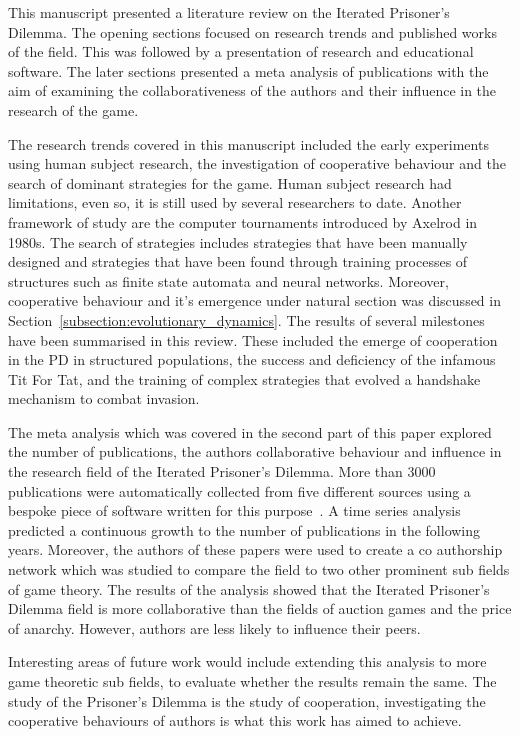 \documentclass{article}
\theoremstyle{definition}
\begin{document}
This manuscript presented a literature review on the Iterated
Prisoner's Dilemma. The opening sections focused on research trends and
published works of the field. This was followed by a
presentation of research and educational software. The later sections presented a
meta analysis of publications with the aim of examining the collaborativeness of
the authors and their influence in the research of the game.

The research trends covered in this manuscript included the early experiments
using human subject research, the investigation of cooperative behaviour and the
search of dominant strategies for the game. Human subject research had
limitations, even so, it is still used by several researchers to date. Another
framework of study are the computer tournaments introduced by Axelrod in
1980s. The search of strategies includes strategies that have been manually
designed and strategies that have been found through
training processes of structures such as finite state automata and neural
networks. Moreover, cooperative behaviour and it's emergence under natural
section was discussed in Section~\ref{subsection:evolutionary_dynamics}.
The results of several milestones have been summarised in this review. These
included the emerge of cooperation in the PD in structured populations, the success
and deficiency of the infamous Tit For Tat, and the training of complex strategies
that evolved a handshake mechanism to combat invasion.

The meta analysis which was covered in the second part of this paper explored
the number of publications, the authors collaborative behaviour and influence in
the research field of the Iterated Prisoner's Dilemma. More than 3000
publications were automatically collected from five different sources using a bespoke
piece of software written for this purpose~\cite{nikoleta_2017}. A time
series analysis predicted a continuous growth to the number of publications in
the following years. Moreover, the authors of these papers were used to create a
co authorship network which was studied to compare the field to two other
prominent sub fields of game theory. The results of the analysis showed that the
Iterated Prisoner's Dilemma field is more collaborative than the fields of
auction games and the price of anarchy. However, authors are less
likely to influence their peers.

Interesting areas of future work would include extending this analysis to more
game theoretic sub fields, to evaluate whether the results remain the same. The
study of the Prisoner's Dilemma is the study of cooperation, investigating the
cooperative behaviours of authors is what this work has aimed to achieve.
\end{document}
